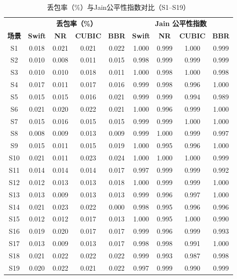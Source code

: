 \begin{table}[htbp]
\centering
\caption{丢包率（\%）与Jain公平性指数对比（S1--S19）}
\label{tab:loss_summary}
\footnotesize
\setlength{\tabcolsep}{4pt}
\begin{tabular}{|c|cccc|cccc|}
\hline
& \multicolumn{4}{c|}{\textbf{丢包率（\%）}} & \multicolumn{4}{c|}{\textbf{Jain 公平性指数}} \\
\textbf{场景} & \textbf{Swift} & \textbf{NR} & \textbf{CUBIC} & \textbf{BBR} & \textbf{Swift} & \textbf{NR} & \textbf{CUBIC} & \textbf{BBR} \\
\hline
S1 & 0.018 & 0.021 & 0.021 & 0.022 & 1.000 & 0.999 & 1.000 & 0.999 \\
S2 & 0.010 & 0.008 & 0.011 & 0.015 & 0.998 & 0.999 & 0.999 & 0.999 \\
S3 & 0.010 & 0.010 & 0.018 & 0.011 & 1.000 & 0.998 & 1.000 & 0.998 \\
S4 & 0.017 & 0.011 & 0.017 & 0.016 & 0.999 & 0.998 & 0.996 & 1.000 \\
S5 & 0.015 & 0.015 & 0.016 & 0.021 & 0.999 & 0.999 & 0.994 & 0.989 \\
S6 & 0.021 & 0.020 & 0.022 & 0.021 & 1.000 & 0.996 & 0.999 & 1.000 \\
S7 & 0.015 & 0.016 & 0.015 & 0.015 & 0.999 & 0.999 & 1.000 & 1.000 \\
S8 & 0.008 & 0.009 & 0.013 & 0.009 & 0.999 & 1.000 & 0.999 & 0.997 \\
S9 & 0.015 & 0.011 & 0.015 & 0.019 & 1.000 & 0.995 & 0.996 & 1.000 \\
S10 & 0.021 & 0.011 & 0.023 & 0.024 & 1.000 & 1.000 & 1.000 & 0.999 \\
S11 & 0.014 & 0.014 & 0.014 & 0.017 & 0.997 & 0.999 & 0.999 & 0.992 \\
S12 & 0.012 & 0.013 & 0.013 & 0.018 & 1.000 & 0.999 & 0.999 & 1.000 \\
S13 & 0.013 & 0.009 & 0.013 & 0.013 & 0.999 & 0.996 & 0.997 & 1.000 \\
S14 & 0.021 & 0.023 & 0.022 & 0.000 & 0.998 & 0.995 & 0.996 & 0.996 \\
S15 & 0.012 & 0.012 & 0.017 & 0.013 & 1.000 & 0.995 & 1.000 & 0.990 \\
S16 & 0.019 & 0.020 & 0.017 & 0.017 & 0.999 & 0.996 & 0.999 & 0.993 \\
S17 & 0.013 & 0.009 & 0.013 & 0.017 & 0.998 & 0.998 & 0.991 & 1.000 \\
S18 & 0.021 & 0.022 & 0.022 & 0.022 & 0.999 & 0.993 & 0.987 & 0.998 \\
S19 & 0.020 & 0.022 & 0.021 & 0.022 & 0.997 & 0.999 & 0.990 & 0.999 \\
\hline
\end{tabular}
\end{table}

